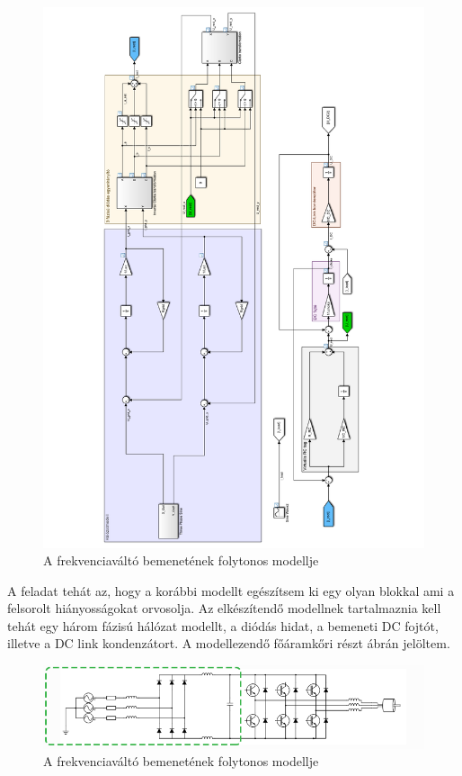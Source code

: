 \begin{figure}[]
	\centering
	\includegraphics[width = 1.2\textwidth]{figures/model_continous.pdf}
	\caption{A frekvenciaváltó bemenetének folytonos modellje} 
	\label{fig:cont_input_model}
\end{figure}

A feladat tehát az, hogy a korábbi modellt egészítsem ki egy olyan blokkal ami a felsorolt hiányosságokat orvosolja. Az elkészítendő modellnek tartalmaznia kell tehát egy három fázisú hálózat modellt, a diódás hidat, a bemeneti DC fojtót, illetve a DC link kondenzátort. A modellezendő főáramkőri részt  ábrán jelöltem. 

\begin{figure}[H!]
	\centering
	\includegraphics[width = \textwidth]{figures/VFDschematic_choke_marked.png}
	\caption{A frekvenciaváltó bemenetének folytonos modellje} 
	\label{fig:input_marked}
\end{figure}

